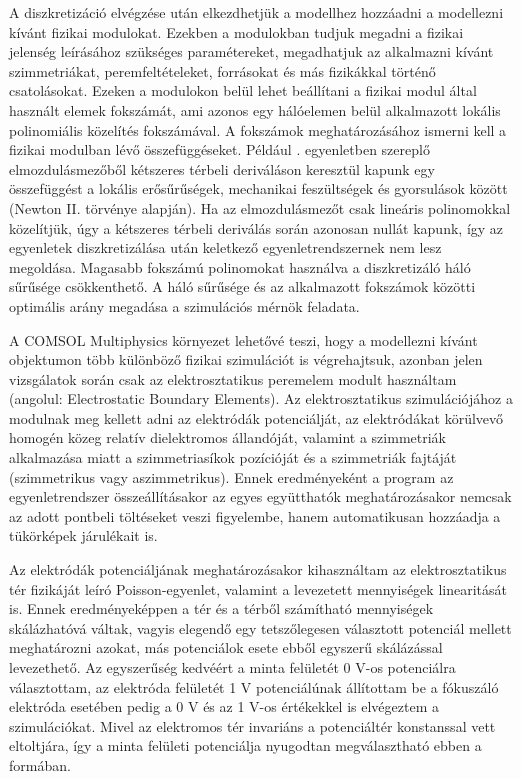 A diszkretizáció elvégzése után elkezdhetjük a modellhez hozzáadni a modellezni kívánt fizikai modulokat. Ezekben a modulokban tudjuk megadni a fizikai jelenség leírásához szükséges paramétereket, megadhatjuk az alkalmazni kívánt szimmetriákat, peremfeltételeket, forrásokat és más fizikákkal történő csatolásokat. Ezeken a modulokon belül lehet beállítani a fizikai modul által használt elemek fokszámát, ami azonos egy hálóelemen belül alkalmazott lokális polinomiális közelítés fokszámával. A fokszámok meghatározásához ismerni kell a fizikai modulban lévő összefüggéseket. Például . egyenletben szereplő elmozdulásmezőből kétszeres térbeli deriváláson keresztül kapunk egy összefüggést a lokális erősűrűségek, mechanikai feszültségek és gyorsulások között (Newton II. törvénye alapján). Ha az elmozdulásmezőt csak lineáris polinomokkal közelítjük, úgy a kétszeres térbeli deriválás során azonosan nullát kapunk, így az egyenletek diszkretizálása után keletkező egyenletrendszernek nem lesz megoldása. Magasabb fokszámú polinomokat használva a diszkretizáló háló sűrűsége csökkenthető. A háló sűrűsége és az alkalmazott fokszámok közötti optimális arány megadása a szimulációs mérnök feladata.

A COMSOL Multiphysics környezet lehetővé teszi, hogy a modellezni kívánt objektumon több különböző fizikai szimulációt is végrehajtsuk, azonban jelen vizsgálatok során csak az elektrosztatikus peremelem modult használtam (angolul: Electrostatic Boundary Elements). Az elektrosztatikus szimulációjához a modulnak meg kellett adni az elektródák potenciálját, az elektródákat körülvevő homogén közeg relatív dielektromos állandóját, valamint a szimmetriák alkalmazása miatt a szimmetriasíkok pozícióját és a szimmetriák fajtáját (szimmetrikus vagy aszimmetrikus). Ennek eredményeként a program az egyenletrendszer összeállításakor az egyes együtthatók meghatározásakor nemcsak az adott pontbeli töltéseket veszi figyelembe, hanem automatikusan hozzáadja a tükörképek járulékait is.

Az elektródák potenciáljának meghatározásakor kihasználtam az elektrosztatikus tér fizikáját leíró Poisson-egyenlet, valamint a levezetett mennyiségek linearitását is. Ennek eredményeképpen a tér és a térből számítható mennyiségek skálázhatóvá váltak, vagyis elegendő egy tetszőlegesen választott potenciál mellett meghatározni azokat, más potenciálok esete ebből egyszerű skálázással levezethető. Az egyszerűség kedvéért a minta felületét 0 V-os potenciálra választottam, az elektróda felületét 1 V potenciálúnak állítottam be a fókuszáló elektróda esetében pedig a 0 V és az 1 V-os értékekkel is elvégeztem a szimulációkat. Mivel az elektromos tér invariáns a potenciáltér konstanssal vett eltoltjára, így a minta felületi potenciálja nyugodtan megválasztható ebben a formában.

